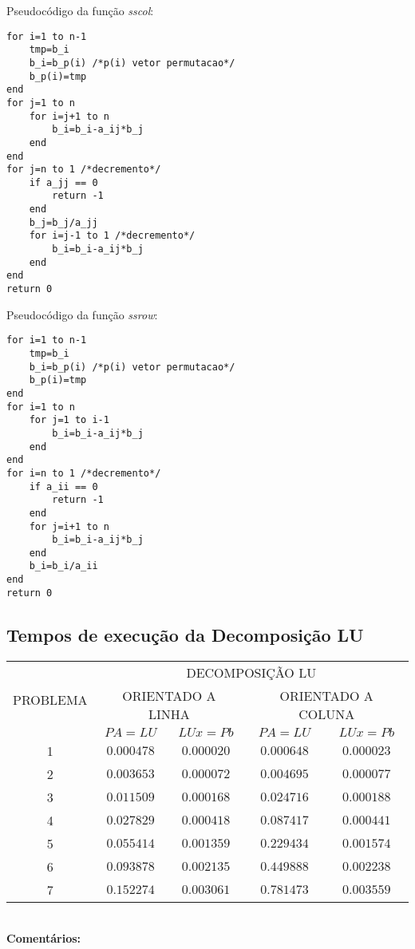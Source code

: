 \documentclass[a4paper,11pt]{article}
\begin{document}
Pseudocódigo da função {\it sscol}:
\begin{lstlisting}
for i=1 to n-1
	tmp=b_i
	b_i=b_p(i) /*p(i) vetor permutacao*/
	b_p(i)=tmp
end
for j=1 to n
	for i=j+1 to n
		b_i=b_i-a_ij*b_j
	end
end
for j=n to 1 /*decremento*/
	if a_jj == 0
		return -1
	end
	b_j=b_j/a_jj
	for i=j-1 to 1 /*decremento*/
		b_i=b_i-a_ij*b_j
	end
end
return 0
\end{lstlisting}
Pseudocódigo da função {\it ssrow}:
\begin{lstlisting}
for i=1 to n-1
	tmp=b_i
	b_i=b_p(i) /*p(i) vetor permutacao*/
	b_p(i)=tmp
end
for i=1 to n
	for j=1 to i-1
		b_i=b_i-a_ij*b_j
	end
end
for i=n to 1 /*decremento*/
	if a_ii == 0
		return -1
	end
	for j=i+1 to n
		b_i=b_i-a_ij*b_j
	end
	b_i=b_i/a_ii
end
return 0
\end{lstlisting}

\subsection{Tempos de execução da Decomposição LU}

\begin{table}[htb]
	\label{tab:inters}
	\large
	\centering
	\begin{tabular}{|c|c|c||c|c|}
		\hline
		\multirow{3}{*}{PROBLEMA} & \multicolumn{4}{|c|}{DECOMPOSIÇÃO LU} \\
		\cline{2-5}
		& \multicolumn{2}{|c||}{ORIENTADO A LINHA} & \multicolumn{2}{|c|}{ORIENTADO A COLUNA} \\
		\cline{2-5}
		& $PA=LU$ & $LUx=Pb$ & $PA=LU$ & $LUx=Pb$ \\
		\hline
		\hline
		1 & $0.000478$ & $0.000020$ & $0.000648$ & $0.000023$ \\
		2 & $0.003653$ & $0.000072$ & $0.004695$ & $0.000077$ \\
		3 & $0.011509$ & $0.000168$ & $0.024716$ & $0.000188$ \\
		4 & $0.027829$ & $0.000418$ & $0.087417$ & $0.000441$ \\
		5 & $0.055414$ & $0.001359$ & $0.229434$ & $0.001574$ \\
		6 & $0.093878$ & $0.002135$ & $0.449888$ & $0.002238$ \\
		7 & $0.152274$ & $0.003061$ & $0.781473$ & $0.003559$ \\
		\hline
	\end{tabular}
\end{table}
\  \\
{\bf Comentários:}
\end{document}
